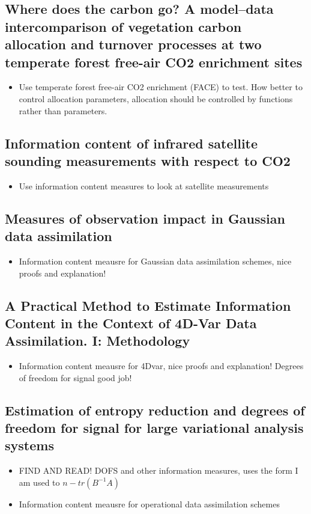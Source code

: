 \documentclass[11pt]{article}
\begin{document}
\subsection*{Where does the carbon go? A model--data intercomparison of vegetation carbon allocation and turnover processes at two temperate forest free-air CO2 enrichment sites \cite{de2014does}}
\begin{itemize}
\item Use temperate forest free-air CO2 enrichment (FACE) to test. How better to control allocation parameters, allocation should be controlled by functions rather than parameters.
\end{itemize}


\subsection*{Information content of infrared satellite sounding measurements with respect to CO2 \cite{engelen2004information}}
\begin{itemize}
\item Use information content measures to look at satellite measurements
\end{itemize}


\subsection*{Measures of observation impact in Gaussian data assimilation \cite{fowler2011measures}}
\begin{itemize}
\item Information content meausre for Gaussian data assimilation schemes, nice proofs and explanation!
\end{itemize}


\subsection*{A Practical Method to Estimate Information Content in the Context of 4D-Var Data Assimilation. I: Methodology \cite{sandu2012practical}}
\begin{itemize}
\item Information content meausre for 4Dvar, nice proofs and explanation! Degrees of freedom for signal good job!
\end{itemize}


\subsection*{Estimation of entropy reduction and degrees of freedom for signal for large variational analysis systems \cite{fisher2003estimation}}
\begin{itemize}
\item FIND AND READ! DOFS and other information measures, uses the form I am used to $n - tr(B^{-1}A)$
\item Information content meausre for operational data assimilation schemes
\end{itemize}
\end{document}
